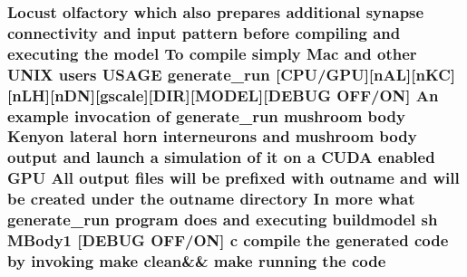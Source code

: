 \hypertarget{userproject_2MBody1__project_2README_8txt_aecf2b086d6bbaf184edb53c042023d93}{
\subsubsection[{code}]{\setlength{\rightskip}{0pt plus 5cm}Locust olfactory which also prepares additional synapse connectivity and input pattern before compiling and executing the {\bf model} To compile simply Mac and other U\+N\+I\+X users U\+S\+A\+G\+E {\bf generate\+\_\+run} \mbox{[}{\bf C\+P\+U}/{\bf G\+P\+U}\mbox{]}\mbox{[}n\+A\+L\mbox{]}\mbox{[}n\+K\+C\mbox{]}\mbox{[}n\+L\+H\mbox{]}\mbox{[}n\+D\+N\mbox{]}\mbox{[}gscale\mbox{]}\mbox{[}D\+I\+R\mbox{]}\mbox{[}M\+O\+D\+E\+L\mbox{]}\mbox{[}D\+E\+B\+U\+G O\+F\+F/O\+N\mbox{]} An example invocation of {\bf generate\+\_\+run} mushroom body Kenyon lateral horn {\bf interneurons} and mushroom body output and launch a simulation of {\bf it} on a C\+U\+D\+A enabled {\bf G\+P\+U} All output files will be prefixed {\bf with} outname and will be created under the outname {\bf directory} In more what {\bf generate\+\_\+run} program does and executing buildmodel sh M\+Body1 \mbox{[}D\+E\+B\+U\+G O\+F\+F/O\+N\mbox{]} c compile the generated code by invoking make clean\&\& make running the code}}\label{userproject_2MBody1__project_2README_8txt_aecf2b086d6bbaf184edb53c042023d93}
